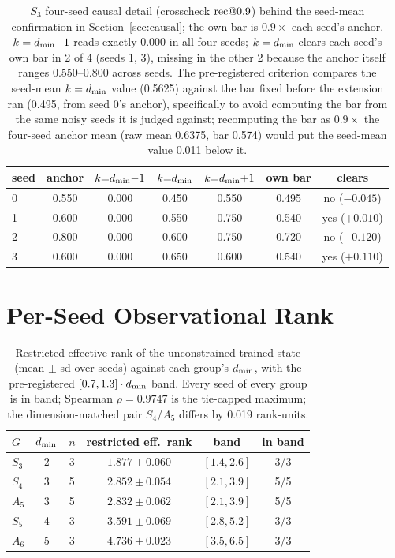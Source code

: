 \begin{table}[H]
\centering
\small
\begin{tabular}{lcccccc}
\toprule
seed & anchor & $k{=}d_{\min}{-}1$ & $k{=}d_{\min}$ & $k{=}d_{\min}{+}1$ & own bar & clears \\
\midrule
0 & 0.550 & 0.000 & 0.450 & 0.550 & 0.495 & no ($-0.045$) \\
1 & 0.600 & 0.000 & 0.550 & 0.750 & 0.540 & yes ($+0.010$) \\
2 & 0.800 & 0.000 & 0.600 & 0.750 & 0.720 & no ($-0.120$) \\
3 & 0.600 & 0.000 & 0.650 & 0.600 & 0.540 & yes ($+0.110$) \\
\bottomrule
\end{tabular}
\caption{$S_3$ four-seed causal detail (crosscheck $\mathrm{rec}@0.9$) behind
the seed-mean confirmation in Section~\ref{sec:causal}; the own bar is
$0.9 \times$ each seed's anchor. $k = d_{\min}{-}1$ reads exactly 0.000 in
all four seeds; $k = d_{\min}$ clears each seed's own bar in 2 of 4 (seeds
1, 3), missing in the other 2 because the anchor itself ranges
0.550--0.800 across seeds. The pre-registered criterion compares the
seed-mean $k = d_{\min}$ value (0.5625) against the bar fixed before the
extension ran (0.495, from seed 0's anchor), specifically to avoid
computing the bar from the same noisy seeds it is judged against;
recomputing the bar as $0.9\times$ the four-seed anchor mean (raw mean
0.6375, bar 0.574) would put the seed-mean value 0.011 below it.}
\label{tab:s3seeds}
\end{table}

\section{Per-Seed Observational Rank}
\label{app:m1}

\begin{table}[H]
\centering
\small
\begin{tabular}{lccccc}
\toprule
$G$ & $d_{\min}$ & $n$ & restricted eff.\ rank & band & in band \\
\midrule
$S_3$ & 2 & 3 & $1.877 \pm 0.060$ & $[1.4, 2.6]$ & 3/3 \\
$S_4$ & 3 & 5 & $2.852 \pm 0.054$ & $[2.1, 3.9]$ & 5/5 \\
$A_5$ & 3 & 5 & $2.832 \pm 0.062$ & $[2.1, 3.9]$ & 5/5 \\
$S_5$ & 4 & 3 & $3.591 \pm 0.069$ & $[2.8, 5.2]$ & 3/3 \\
$A_6$ & 5 & 3 & $4.736 \pm 0.023$ & $[3.5, 6.5]$ & 3/3 \\
\bottomrule
\end{tabular}
\caption{Restricted effective rank of the unconstrained trained state
(mean $\pm$ sd over seeds) against each group's $d_{\min}$, with the
pre-registered $[0.7, 1.3] \cdot d_{\min}$ band. Every seed of every group
is in band; Spearman $\rho = 0.9747$ is the tie-capped maximum; the
dimension-matched pair $S_4$/$A_5$ differs by 0.019 rank-units.}
\label{tab:m1}
\end{table}
